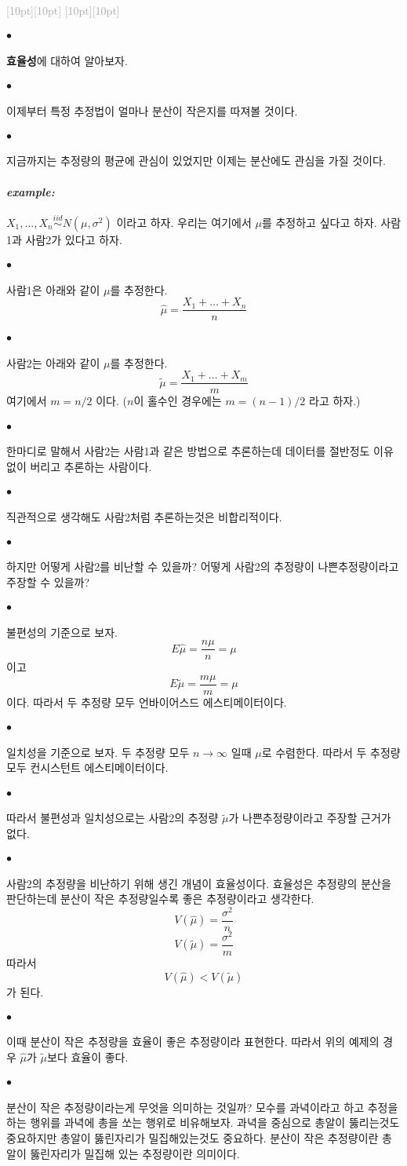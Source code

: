 \documentclass[12pt,oneside,english]{book}
\newcommand{\rdash}{\noindent \textcolor{darkgray}{ \raisebox{-1.9pt}[10pt][10pt]{\leafright} \hrulefill \raisebox{-1.9pt}[10pt][10pt]{\leafright \decofourleft \decothreeleft  \aldineright \decotwo \floweroneleft \decoone}}}
\def\ck{\paragraph{\Large$\bullet$}\Large}
\def\ex{\paragraph{\Large\textit{example:}}\Large}
\begin{document}
\rdash 

\ck \textbf{효율성}에 대하여 알아보자. 

\ck 이제부터 특정 추정법이 얼마나 분산이 작은지를 따져볼 것이다. 

\ck 지금까지는 추정량의 평균에 관심이 있었지만 이제는 분산에도 관심을 가질 것이다. 

\ex $X_1,\dots, X_n \overset{iid}{\sim} N(\mu,\sigma^2)$ 이라고 하자. 우리는 여기에서 $\mu$를 추정하고 싶다고 하자. 사람1과 사람2가 있다고 하자. 

\ck 사람1은 아래와 같이 $\mu$를 추정한다. 
\[
\hat\mu=\frac{X_1+\dots+X_n}{n}
\]

\ck 사람2는 아래와 같이 $\mu$를 추정한다. 
\[
\tilde\mu=\frac{X_1+\dots+X_m}{m}
\]
여기에서 $m=n/2$ 이다. ($n$이 홀수인 경우에는 $m=(n-1)/2$ 라고 하자.) 

\ck 한마디로 말해서 사람2는 사람1과 같은 방법으로 추론하는데 데이터를 절반정도 이유없이 버리고 추론하는 사람이다. 

\ck 직관적으로 생각해도 사람2처럼 추론하는것은 비합리적이다. 

\ck 하지만 어떻게 사람2를 비난할 수 있을까? 어떻게 사람2의 추정량이 나쁜추정량이라고 주장할 수 있을까?

\ck 불편성의 기준으로 보자. 
\[
E\hat\mu=\frac{n\mu}{n}=\mu
\]
이고 
\[
E\tilde\mu=\frac{m\mu}{m}=\mu
\]
이다. 따라서 두 추정량 모두 언바이어스드 에스티메이터이다. 

\ck 일치성을 기준으로 보자. 두 추정량 모두 $n\to \infty$ 일때 $\mu$로 수렴한다. 따라서 두 추정량 모두 컨시스턴트 에스티메이터이다. 

\ck 따라서 불편성과 일치성으로는 사람2의 추정량 $\tilde\mu$가 나쁜추정량이라고 주장할 근거가 없다. 

\ck 사람2의 추정량을 비난하기 위해 생긴 개념이 효율성이다. 효율성은 추정량의 분산을 판단하는데 분산이 작은 추정량일수록 좋은 추정량이라고 생각한다. 
\[
V(\hat\mu)=\frac{\sigma^2}{n}
\]
\[
V(\tilde \mu)=\frac{\sigma^2}{m}
\]
따라서 
\[
V(\hat\mu) < V(\tilde\mu)
\]
가 된다. 

\ck 이때 분산이 작은 추정량을 효율이 좋은 추정량이라 표현한다. 따라서 위의 예제의 경우 $\hat\mu$가 $\tilde\mu$보다 효율이 좋다. 


\ck 분산이 작은 추정량이라는게 무엇을 의미하는 것일까? 모수를 과녁이라고 하고 추정을 하는 행위를 과녁에 총을 쏘는 행위로 비유해보자. 과녁을 중심으로 총알이 뚫리는것도 중요하지만 총알이 뚫린자리가 밀집해있는것도 중요하다. 분산이 작은 추정량이란 총알이 뚫린자리가 밀집해 있는 추정량이란 의미이다. 
\end{document}
